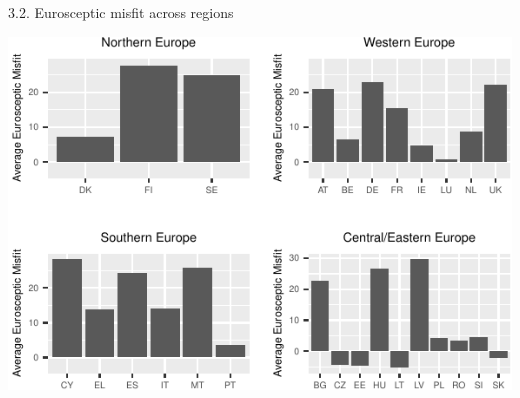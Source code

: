 \begin{frame}{3.2. Eurosceptic misfit across regions}

\begin{center}\includegraphics{graphs/displaying_plot-1} \end{center}

\end{frame}

